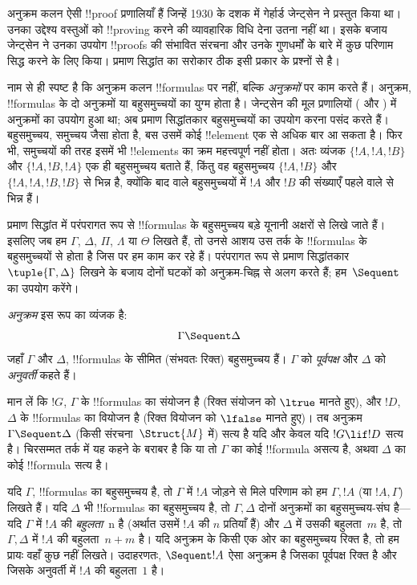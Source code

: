 \documentclass[../../../include/open-logic-section]{subfiles}
\begin{document}


अनुक्रम कलन ऐसी !!{proof} प्रणालियाँ हैं जिन्हें 1930 के दशक में गेर्हार्ड
जेन्ट्सेन ने प्रस्तुत किया था। उनका उद्देश्य वस्तुओं को !!{proving} करने की
व्यावहारिक विधि देना उतना नहीं था। इसके बजाय जेन्ट्सेन ने उनका उपयोग
!!{proof}s की संभावित संरचना और उनके गुणधर्मों के बारे में कुछ परिणाम सिद्ध
करने के लिए किया। प्रमाण सिद्धांत का सरोकार ठीक इसी प्रकार के प्रश्नों से है।

नाम से ही स्पष्ट है कि अनुक्रम कलन !!{formula}s पर नहीं, बल्कि
\emph{अनुक्रमों} पर काम करते हैं। अनुक्रम, !!{formula}s के दो अनुक्रमों या
बहुसमुच्चयों का युग्म होता है। जेन्ट्सेन की मूल प्रणालियों ( और
) में अनुक्रमों का उपयोग हुआ था; अब प्रमाण सिद्धांतकार बहुसमुच्चयों
का उपयोग करना पसंद करते हैं। बहुसमुच्चय, समुच्चय जैसा होता है, बस उसमें कोई
!!{element} एक से अधिक बार आ सकता है। फिर भी, समुच्चयों की तरह इसमें भी
!!{element}s का क्रम महत्त्वपूर्ण नहीं होता। अतः व्यंजक $\{!A, !A, !B\}$ और
$\{!A, !B, !A\}$ एक ही बहुसमुच्चय बताते हैं, किंतु वह बहुसमुच्चय $\{!A,
!B\}$ और $\{!A, !A, !B, !B\}$ से भिन्न है, क्योंकि बाद वाले बहुसमुच्चयों में
$!A$ और $!B$ की संख्याएँ पहले वाले से भिन्न हैं।

प्रमाण सिद्धांत में परंपरागत रूप से !!{formula}s के बहुसमुच्चय बड़े यूनानी
अक्षरों से लिखे जाते हैं। इसलिए जब हम $\Gamma$, $\Delta$, $\Pi$, $\Lambda$
या $\Theta$ लिखते हैं, तो उनसे आशय उस तर्क के !!{formula}s के बहुसमुच्चयों
से होता है जिस पर हम काम कर रहे हैं। परंपरागत रूप से प्रमाण सिद्धांतकार
$\tuple{\Gamma, \Delta}$ लिखने के बजाय दोनों घटकों को अनुक्रम-चिह्न से अलग
करते हैं; हम~$\Sequent$ का उपयोग करेंगे।

\begin{defn}[अनुक्रम]
\emph{अनुक्रम} इस रूप का व्यंजक है:
\[
\Gamma \Sequent \Delta
\]
जहाँ $\Gamma$ और $\Delta$, !!{formula}s के सीमित (संभवतः रिक्त) बहुसमुच्चय
हैं। $\Gamma$ को \emph{पूर्वपक्ष} और $\Delta$ को \emph{अनुवर्ती} कहते हैं।
\end{defn}

मान लें कि $!G$, $\Gamma$ के !!{formula}s का संयोजन है (रिक्त संयोजन को
$\ltrue$ मानते हुए), और $!D$, $\Delta$ के !!{formula}s का वियोजन है (रिक्त
वियोजन को $\lfalse$ मानते हुए)। तब अनुक्रम $\Gamma \Sequent \Delta$ (किसी
संरचना~$\Struct{M}$ में) सत्य है यदि और केवल यदि $!G \lif !D$ सत्य है।
चिरसम्मत तर्क में यह कहने के बराबर है कि या तो $\Gamma$ का कोई !!{formula}
असत्य है, अथवा $\Delta$ का कोई !!{formula} सत्य है।

यदि $\Gamma$, !!{formula}s का बहुसमुच्चय है, तो $\Gamma$ में $!A$ जोड़ने से
मिले परिणाम को हम $\Gamma, !A$ (या $!A, \Gamma$) लिखते हैं। यदि $\Delta$ भी
!!{formula}s का बहुसमुच्चय है, तो $\Gamma, \Delta$ दोनों अनुक्रमों का
बहुसमुच्चय-संघ है---यदि $\Gamma$ में $!A$ की \emph{बहुलता}~n है (अर्थात
उसमें $!A$ की $n$ प्रतियाँ हैं) और $\Delta$ में उसकी बहुलता~$m$ है, तो
$\Gamma, \Delta$ में $!A$ की बहुलता~$n+m$ है। यदि अनुक्रम के किसी एक ओर का
बहुसमुच्चय रिक्त है, तो हम प्रायः वहाँ कुछ नहीं लिखते। उदाहरणतः,
$\Sequent !A$ ऐसा अनुक्रम है जिसका पूर्वपक्ष रिक्त है और जिसके अनुवर्ती में
$!A$ की बहुलता~$1$ है।
\end{document}
